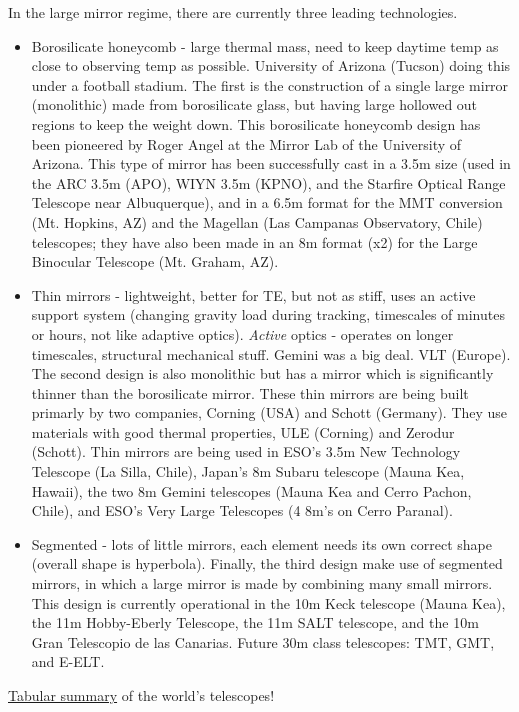 \documentclass[12pt]{article}
\begin{document}
In the large mirror regime, there are currently three leading technologies.
\begin{itemize}
    \item Borosilicate honeycomb -
        \textcolor{myBlue}{%
        large thermal mass, need to keep daytime
        temp as close to observing temp as possible. University of Arizona
        (Tucson) doing this under a football stadium.}
        The first is the construction of a single large mirror
        (monolithic) made from borosilicate glass, but having large hollowed
        out regions to keep the weight down. This borosilicate honeycomb
        design has been pioneered by Roger Angel at the Mirror Lab of the
        University of Arizona. This type of mirror has been successfully cast
        in a 3.5m size (used in the ARC 3.5m (APO), WIYN 3.5m (KPNO), and the
        Starfire Optical Range Telescope near Albuquerque), and in a 6.5m
        format for the MMT conversion (Mt. Hopkins, AZ) and the Magellan (Las
        Campanas Observatory, Chile) telescopes; they have also been made in
        an 8m format (x2) for the Large Binocular Telescope (Mt. Graham, AZ).
    \item \textcolor{myBlue}{Thin mirrors - lightweight, better for TE, but not as stiff, uses
        an active support system (changing gravity load during tracking,
        timescales of minutes or hours, not like adaptive optics).
        \emph{Active} optics - operates on longer timescales, structural
        mechanical stuff. Gemini was a big deal. VLT (Europe).}
        The second design is also monolithic but has a mirror which is
        significantly thinner than the borosilicate mirror. These thin mirrors
        are being built primarly by two companies, Corning (USA) and Schott
        (Germany). They use materials with good thermal properties, ULE
        (Corning) and Zerodur (Schott). Thin mirrors are being used in ESO's
        3.5m New Technology Telescope (La Silla, Chile), Japan's 8m Subaru
        telescope (Mauna Kea, Hawaii), the two 8m Gemini telescopes (Mauna Kea
        and Cerro Pachon, Chile), and ESO's Very Large Telescopes (4 8m's on
        Cerro Paranal).
    \item \textcolor{myBlue}{Segmented - lots of little mirrors, each element needs its own correct
            shape (overall shape is hyperbola).}
        Finally, the third design make use of segmented
        mirrors, in which a large mirror is made by combining many small
        mirrors. This design is currently operational in the 10m Keck
        telescope (Mauna Kea), the 11m Hobby-Eberly Telescope, the 11m SALT
        telescope, and the 10m Gran Telescopio de las Canarias. Future 30m
        class telescopes: TMT, GMT, and E-ELT.
\end{itemize}
\href{http://astro.nineplanets.org/bigeyes.html}{Tabular summary}
of the world's telescopes!
\end{document}
